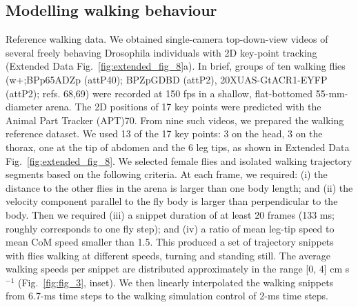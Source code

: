 \documentclass[sn-mathphys-num]{sn-jnl}%
\theoremstyle{thmstyleone}%
\theoremstyle{thmstyletwo}%
\theoremstyle{thmstylethree}%
\begin{document}
\subsection{Modelling walking behaviour}

Reference walking data. We obtained single-camera top-down-view videos of several freely behaving Drosophila individuals with 2D key-point tracking\cite{robie2024fly} (Extended Data Fig.~\ref{fig:extended_fig_8}a). 
In brief, groups of ten walking flies (w+;BPp65ADZp (attP40); BPZpGDBD (attP2), 20XUAS-GtACR1-EYFP (attP2); refs. 68,69) were recorded at 150 fps in a shallow, flat-bottomed 55-mm-diameter arena.
The 2D positions of 17 key points were predicted with the Animal Part Tracker (APT)70. 
From nine such videos, we prepared the walking reference dataset. 
We used 13 of the 17 key points: 3 on the head, 3 on the thorax, one at the tip of abdomen and the 6 leg tips, as shown in Extended Data Fig.~\ref{fig:extended_fig_8}. 
We selected female flies and isolated walking trajectory segments based on the following criteria. 
At each frame, we required: (i) the distance to the other flies in the arena is larger than one body length; and (ii) the velocity component parallel to the fly body is larger than perpendicular to the body. 
Then we required (iii) a snippet duration of at least 20 frames (133 ms; roughly corresponds to one fly step); 
and (iv) a ratio of mean leg-tip speed to mean CoM speed smaller than 1.5. 
This produced a set of trajectory snippets with flies walking at different speeds, turning and standing still. 
The average walking speeds per snippet are distributed approximately in the range [0, 4] cm s$ ^{-1} $ (Fig.~\ref{fig:fig_3}, inset). 
We then linearly interpolated the walking snippets from 6.7-ms time steps to the walking simulation control of 2-ms time steps.
\end{document}
